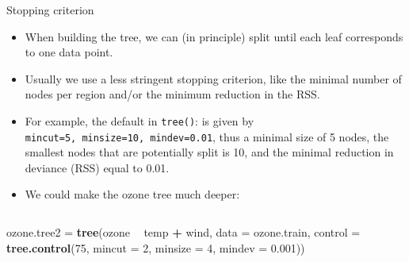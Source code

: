 \documentclass[10pt,ignorenonframetext,]{beamer}
\newenvironment{Shaded}{\begin{snugshade}}{\end{snugshade}}
\newcommand{\DataTypeTok}[1]{\textcolor[rgb]{0.13,0.29,0.53}{#1}}
\newcommand{\DecValTok}[1]{\textcolor[rgb]{0.00,0.00,0.81}{#1}}
\newcommand{\FloatTok}[1]{\textcolor[rgb]{0.00,0.00,0.81}{#1}}
\newcommand{\KeywordTok}[1]{\textcolor[rgb]{0.13,0.29,0.53}{\textbf{#1}}}
\newcommand{\NormalTok}[1]{#1}
\newcommand{\OperatorTok}[1]{\textcolor[rgb]{0.81,0.36,0.00}{\textbf{#1}}}
\newcommand{\StringTok}[1]{\textcolor[rgb]{0.31,0.60,0.02}{#1}}
\providecommand{\tightlist}{%
  \setlength{\itemsep}{0pt}\setlength{\parskip}{0pt}}
\begin{document}
\begin{frame}[fragile]

\begin{block}{Stopping criterion}

\vspace{2mm}

\begin{itemize}
\tightlist
\item
  When building the tree, we can (in principle) split until each leaf
  corresponds to one data point.
\end{itemize}

\vspace{2mm}

\begin{itemize}
\tightlist
\item
  Usually we use a less stringent stopping criterion, like the minimal
  number of nodes per region and/or the minimum reduction in the RSS.
\end{itemize}

\vspace{2mm}

\begin{itemize}
\tightlist
\item
  For example, the default in \texttt{tree()}: is given by
  \texttt{mincut=5,\ minsize=10,\ mindev=0.01}, thus a minimal size of 5
  nodes, the smallest nodes that are potentially split is 10, and the
  minimal reduction in deviance (RSS) equal to 0.01.
\end{itemize}

\vspace{2mm}

\begin{itemize}
\tightlist
\item
  We could make the ozone tree much deeper:
\end{itemize}

\(~\)

\scriptsize

\begin{Shaded}
\begin{Highlighting}[]
\NormalTok{ozone.tree2 =}\StringTok{ }\KeywordTok{tree}\NormalTok{(ozone }\OperatorTok{~}\StringTok{ }\NormalTok{temp }\OperatorTok{+}\StringTok{ }\NormalTok{wind, }\DataTypeTok{data =}\NormalTok{ ozone.train, }\DataTypeTok{control =} \KeywordTok{tree.control}\NormalTok{(}\DecValTok{75}\NormalTok{, }
    \DataTypeTok{mincut =} \DecValTok{2}\NormalTok{, }\DataTypeTok{minsize =} \DecValTok{4}\NormalTok{, }\DataTypeTok{mindev =} \FloatTok{0.001}\NormalTok{))}
\end{Highlighting}
\end{Shaded}

\end{block}

\end{frame}
\end{document}
